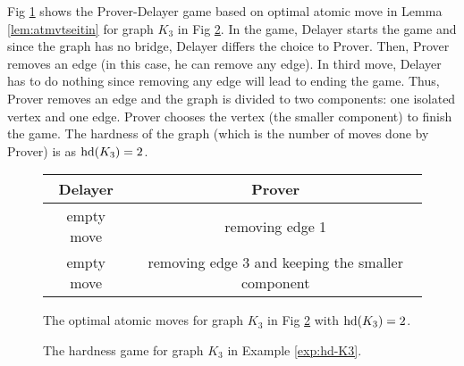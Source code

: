 \documentclass{report}
\begin{document}
\begin{examp}\label{exp:hd-K3}
Fig \ref{fig:game1} shows the Prover-Delayer game based on optimal atomic move in Lemma \ref{lem:atmvtseitin} for graph $K_3$ in Fig \ref{fig:hd1}. In the game, Delayer starts the game and since the graph has no bridge, Delayer differs the choice to Prover. Then, Prover removes an edge (in this case, he can remove any edge). In third move, Delayer has to do nothing since removing any edge will lead to ending the game. Thus, Prover removes an edge and the graph is divided to two components: one isolated vertex and one edge. Prover chooses the vertex (the smaller component) to finish the game. The hardness of the graph (which is the number of moves done by Prover) is as $\operatorname{hd}(K_3)=2$.
  \begin{figure}%
  \centering
  \begin{tabular}{|c|c|} 
                  \hline
                  Delayer & Prover \\ \hline
                  empty move & removing edge 1  \\ \hline
                  empty move & removing edge 3 and keeping the smaller component \\ \hline
  \end{tabular}
  \caption{The optimal atomic moves for graph $K_3$ in Fig \ref{fig:hd1} with $\operatorname{hd}(K_3)=2$.}  \label{fig:game1}
  \end{figure}
  \begin{figure}
  \begin{center}
  \caption{The hardness game for graph $K_3$ in Example \ref{exp:hd-K3}.} \label{fig:hd1}
  \end{center}
  \end{figure}
\end{examp}
\end{document}
